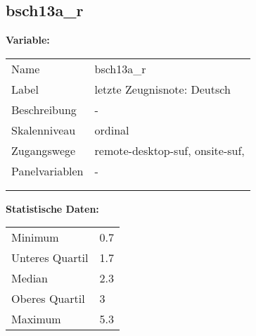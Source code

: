 	
	
	\subsection{bsch13a\_r}
	\label{subSection:bsch13a_r}

	\noindent\textbf{Variable:}\\
		\begin{tabular}{lL{11.3cm}}
			\label{tableVariable:bsch13a_r}
			Name & bsch13a\_r \\
			Label & letzte Zeugnisnote: Deutsch \\
			Beschreibung & - \\
			Skalenniveau & ordinal \\
			Zugangswege &
				remote-desktop-suf,
				onsite-suf,
 \\
			Panelvariablen & -
			 \\
			 \\
 \\
		\end{tabular}



		\vspace*{1 cm}
		\noindent\textbf{Statistische Daten:}\\
			\begin{tabular}{ll}
				\label{tableStatistics:bsch13a_r}
					Minimum & 0.7 \\
					Unteres Quartil & 1.7 \\
					Median & 2.3 \\
					Oberes Quartil & 3 \\
					Maximum & 5.3 \\
			\end{tabular}



